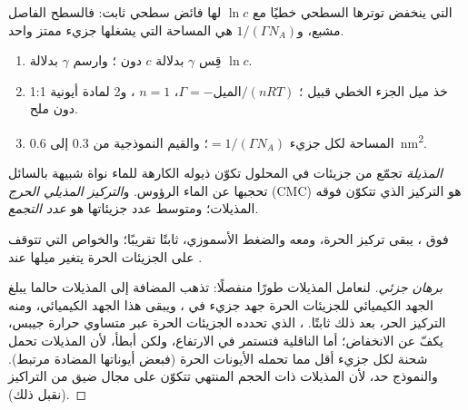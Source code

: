  التي ينخفض توترها السطحي خطيًا مع $\ln c$ لها فائض
سطحي ثابت: فالسطح الفاصل مشبع، و$1/(\Gamma N_A)$ هي المساحة التي يشغلها
جزيء ممتز واحد.

\begin{method}\label{met:b3:colloids:surface-excess}
\begin{enumerate}
  \item قِس $\gamma$ بدلالة $c$ دون ؛ وارسم $\gamma$ بدلالة $\ln c$.
  \item خذ ميل الجزء الخطي قبيل ؛ $\Gamma = -\text{الميل}/(nRT)$، $n
        = 1$ ، و2 لمادة أيونية 1:1 دون ملح.
  \item المساحة لكل جزيء $= 1/(\Gamma N_A)$؛ والقيم النموذجية من 0.3 إلى \qty{0.6}{nm^2}.
\end{enumerate}
\end{method}

\begin{definition}\label{def:b3:colloids:micelle}
\emph{المذيلة} تجمّع من جزيئات  في المحلول
تكوّن ذيوله الكارهة للماء نواة شبيهة بالسائل تحجبها عن الماء
الرؤوس. و\emph{التركيز المذيلي الحرج}
(CMC) هو التركيز الذي تتكوّن فوقه المذيلات؛ 
ومتوسط عدد جزيئاتها هو \emph{عدد التجمع}.
\end{definition}

\begin{proposition}\label{prop:b3:colloids:cmc-break}
فوق ، يبقى تركيز  الحرة، ومعه  والضغط الأسموزي، ثابتًا تقريبًا؛ والخواص التي تتوقف
على الجزيئات الحرة يتغير ميلها عند .
\end{proposition}

\begin{proof}[برهان جزئي]
لنعامل المذيلات طورًا منفصلًا: تذهب  المضافة إلى المذيلات حالما
يبلغ الجهد الكيميائي للجزيئات الحرة جهد جزيء في
، ويبقى هذا الجهد الكيميائي، ومنه التركيز الحر، بعد ذلك
ثابتًا. ، الذي تحدده الجزيئات الحرة عبر متساوي حرارة
جيبس، يكفّ عن الانخفاض؛ أما الناقلية فتستمر في الارتفاع، ولكن أبطأ، لأن
المذيلات تحمل شحنة لكل جزيء أقل مما تحمله الأيونات الحرة (فبعض
أيوناتها المضادة مرتبط). والنموذج حد، لأن المذيلات ذات الحجم المنتهي
تتكوّن على مجال ضيق من التراكيز (نقبل ذلك).
\end{proof}

